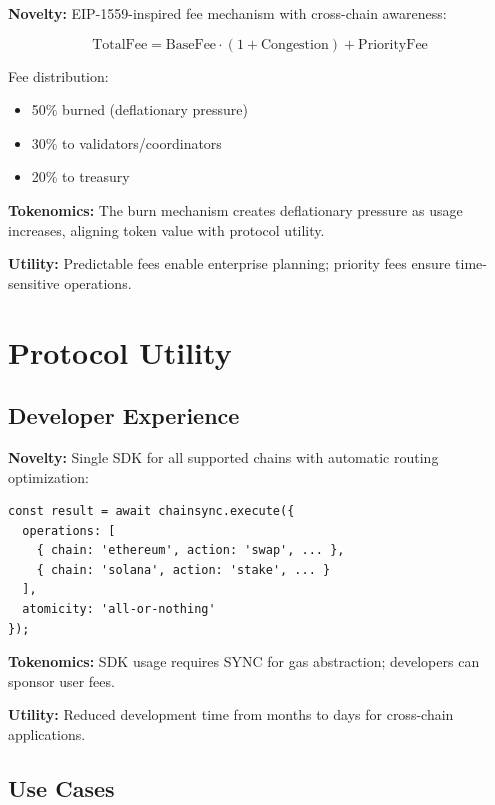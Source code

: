\documentclass[12pt,a4paper]{article}
\begin{document}
\textbf{Novelty:} EIP-1559-inspired fee mechanism with cross-chain awareness:

\begin{equation}
\text{TotalFee} = \text{BaseFee} \cdot (1 + \text{Congestion}) + \text{PriorityFee}
\end{equation}

Fee distribution:
\begin{itemize}
    \item 50\% burned (deflationary pressure)
    \item 30\% to validators/coordinators
    \item 20\% to treasury
\end{itemize}

\textbf{Tokenomics:} The burn mechanism creates deflationary pressure as usage increases, aligning token value with protocol utility.

\textbf{Utility:} Predictable fees enable enterprise planning; priority fees ensure time-sensitive operations.

\section{Protocol Utility}

\subsection{Developer Experience}

\textbf{Novelty:} Single SDK for all supported chains with automatic routing optimization:

\begin{verbatim}
const result = await chainsync.execute({
  operations: [
    { chain: 'ethereum', action: 'swap', ... },
    { chain: 'solana', action: 'stake', ... }
  ],
  atomicity: 'all-or-nothing'
});
\end{verbatim}

\textbf{Tokenomics:} SDK usage requires SYNC for gas abstraction; developers can sponsor user fees.

\textbf{Utility:} Reduced development time from months to days for cross-chain applications.

\subsection{Use Cases}
\end{document}
